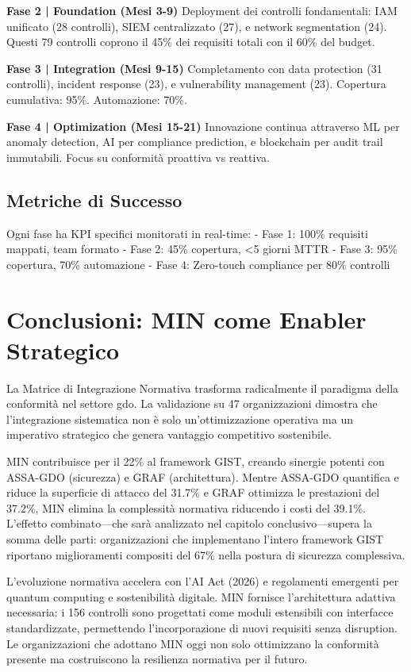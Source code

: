 \textbf{Fase 2 | Foundation (Mesi 3-9)}
Deployment dei controlli fondamentali: IAM unificato (28 controlli), SIEM centralizzato (27), e network segmentation (24). Questi 79 controlli coprono il 45\% dei requisiti totali con il 60\% del budget.

\textbf{Fase 3 | Integration (Mesi 9-15)}
Completamento con data protection (31 controlli), incident response (23), e vulnerability management (23). Copertura cumulativa: 95\%. Automazione: 70\%.

\textbf{Fase 4 | Optimization (Mesi 15-21)}
Innovazione continua attraverso ML per anomaly detection, AI per compliance prediction, e blockchain per audit trail immutabili. Focus su conformità proattiva vs reattiva.

\subsection{\texorpdfstring{Metriche di Successo}{4.7.2 - Metriche di Successo}}

Ogni fase ha KPI specifici monitorati in real-time:
- Fase 1: 100\% requisiti mappati, team formato
- Fase 2: 45\% copertura, <5 giorni MTTR
- Fase 3: 95\% copertura, 70\% automazione
- Fase 4: Zero-touch compliance per 80\% controlli

\section{\texorpdfstring{Conclusioni: MIN come Enabler Strategico}{4.8 - Conclusioni}}
\label{sec:cap4_conclusioni}

La Matrice di Integrazione Normativa trasforma radicalmente il paradigma della conformità nel settore \gls{gdo}. La validazione su 47 organizzazioni dimostra che l'integrazione sistematica non è solo un'ottimizzazione operativa ma un imperativo strategico che genera vantaggio competitivo sostenibile.

MIN contribuisce per il 22\% al framework GIST, creando sinergie potenti con ASSA-GDO (sicurezza) e GRAF (architettura). Mentre ASSA-GDO quantifica e riduce la superficie di attacco del 31.7\% e GRAF ottimizza le prestazioni del 37.2\%, MIN elimina la complessità normativa riducendo i costi del 39.1\%. L'effetto combinato—che sarà analizzato nel capitolo conclusivo—supera la somma delle parti: organizzazioni che implementano l'intero framework GIST riportano miglioramenti compositi del 67\% nella postura di sicurezza complessiva.

L'evoluzione normativa accelera con l'AI Act (2026) e regolamenti emergenti per quantum computing e sostenibilità digitale. MIN fornisce l'architettura adattiva necessaria: i 156 controlli sono progettati come moduli estensibili con interfacce standardizzate, permettendo l'incorporazione di nuovi requisiti senza disruption. Le organizzazioni che adottano MIN oggi non solo ottimizzano la conformità presente ma costruiscono la resilienza normativa per il futuro.

